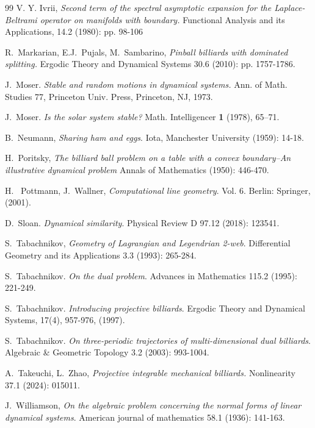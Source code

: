 \documentclass{article}
\begin{document}
\begin{thebibliography}{99}
 V. Y. Ivrii, {\em Second term of the spectral asymptotic expansion for the {L}aplace-{B}eltrami operator on manifolds with
boundary.} Functional Analysis and its Applications, 14.2 (1980): pp. 98-106

 R.~Markarian, E.J.~Pujals, M.~Sambarino, {\em Pinball billiards with dominated splitting.} Ergodic Theory and Dynamical Systems 30.6 (2010): pp. 1757-1786.

 J.~Moser. {\em Stable and random motions in dynamical systems.} Ann. of Math. Studies 77, Princeton Univ. Press, Princeton, NJ, 1973.

 J.~Moser. {\em Is the solar system stable?} Math. Intelligencer {\bf 1} (1978), 65--71.

 B.~Neumann, {\em Sharing ham and eggs}. Iota, Manchester University (1959): 14-18.

 H.~Poritsky, {\em The billiard ball problem on a table with a convex boundary–An illustrative
dynamical problem} Annals of Mathematics (1950): 446-470.

 H.~ Pottmann, J.~Wallner, {\em Computational line geometry}. Vol. 6. Berlin: Springer, (2001).

 D.~Sloan. {\em Dynamical similarity}. Physical Review D 97.12 (2018): 123541.

 S.~Tabachnikov, {\em Geometry of Lagrangian and Legendrian 2-web}. Differential Geometry and its Applications 3.3 (1993): 265-284.

 S.~Tabachnikov. {\em On the dual problem}. Advances in Mathematics 115.2 (1995): 221-249.

 S.~Tabachnikov. {\em Introducing projective billiards}. Ergodic Theory and Dynamical Systems, 17(4), 957-976, (1997).

S.~Tabachnikov. {\em On three-periodic trajectories of multi-dimensional dual billiards}. Algebraic \& Geometric Topology 3.2 (2003): 993-1004.

 A.~Takeuchi, L.~Zhao, {\em Projective integrable mechanical billiards.} Nonlinearity 37.1 (2024): 015011.

 J.~Williamson, {\em On the algebraic problem concerning the normal forms of linear dynamical systems}. American journal of mathematics 58.1 (1936): 141-163.

\end{thebibliography}
\end{document}
